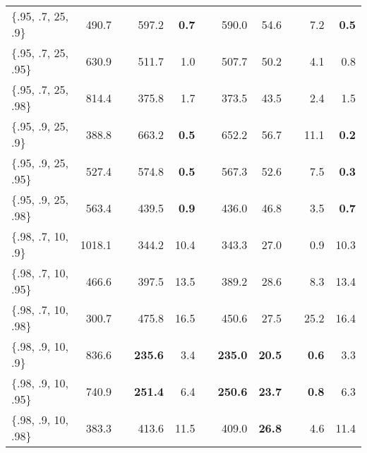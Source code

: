 \documentclass[ba]{imsart}
\numberwithin{equation}{section}
\theoremstyle{plain}
\begin{document}
\begin{table}[!t]
{\begin{tabular}{lrlrrlrrlrr}
\hline
$\{$.95, .7, 25, .9$\}$  & 490.7  &   & {\color{black} 597.2}         & \textbf{ 0.7}         &   & {\color{black} 590.0}      & {\color{black} 54.6}        &   & {\color{black} 7.2}         & \textbf{ 0.5}         \\
$\{$.95, .7, 25, .95$\}$ & 630.9  &   & {\color{black} 511.7}         & 1.0         &   & {\color{black} 507.7}      & {\color{black} 50.2}        &   & 4.1         & 0.8         \\
$\{$.95, .7, 25, .98$\}$ & 814.4  &   & 375.8         & 1.7         &   & 373.5      & 43.5        &   & 2.4         & 1.5         \\
$\{$.95, .9, 25, .9$\}$  & 388.8  &   & {\color{black} 663.2}         & \textbf{ 0.5}         &   & {\color{black} 652.2}      & {\color{black} 56.7}        &   & {\color{black} 11.1}         & \textbf{ 0.2}         \\
$\{$.95, .9, 25, .95$\}$ & 527.4  &   & {\color{black} 574.8}         & \textbf{ 0.5}         &   & {\color{black} 567.3}      & {\color{black} 52.6}        &   & {\color{black} 7.5}         & \textbf{ 0.3}         \\
$\{$.95, .9, 25, .98$\}$ & 563.4  &   & 439.5        & \textbf{ 0.9}         &   & 436.0      & {\color{black} 46.8}        &   & 3.5         & \textbf{ 0.7}         \\
\hline
$\{$.98, .7, 10, .9$\}$  & 1018.1 &   & 344.2         & {\color{black} 10.4}        &   & 343.3      & 27.0        &   & 0.9         & {\color{black} 10.3}        \\
$\{$.98, .7, 10, .95$\}$ & 466.6  &   & 397.5         & {\color{black} 13.5}        &   & 389.2      & 28.6        &   & {\color{black} 8.3}         & {\color{black} 13.4}        \\
$\{$.98, .7, 10, .98$\}$ & 300.7  &   & {\color{black} 475.8}         & {\color{black} 16.5}        &   & {\color{black} 450.6}      & 27.5        &   & {\color{black} 25.2}         & {\color{black} 16.4}        \\
$\{$.98, .9, 10, .9$\}$  & 836.6  &   & \textbf{ 235.6}         & 3.4         &   & \textbf{ 235.0}      & \textbf{ 20.5}        &   & \textbf{ 0.6}         & 3.3         \\
$\{$.98, .9, 10, .95$\}$ & 740.9  &   & \textbf{ 251.4}         & 6.4         &   & \textbf{ 250.6}      & \textbf{ 23.7}        &   & \textbf{ 0.8}         & 6.3         \\
$\{$.98, .9, 10, .98$\}$ & 383.3  &   & 413.6         & {\color{black} 11.5}        &   & 409.0      & \textbf{ 26.8}        &   & 4.6         & {\color{black} 11.4}        \\

\end{tabular}}
\end{table}
\end{document}
